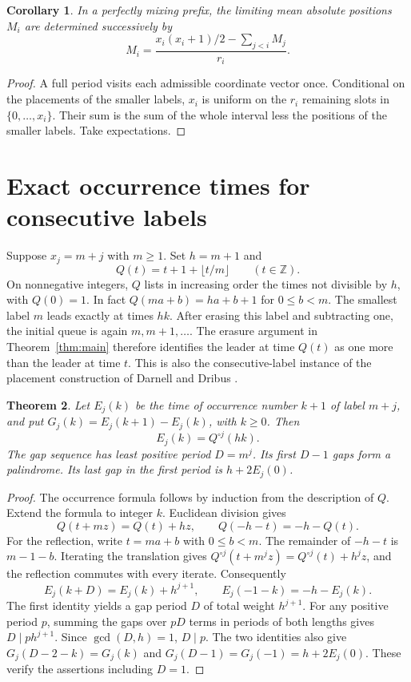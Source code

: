 \documentclass[11pt]{article}
\newtheorem{theorem}{Theorem}
\newtheorem{corollary}[theorem]{Corollary}
\begin{document}
\begin{corollary}\label{cor:mean}
In a perfectly mixing prefix, the limiting mean absolute positions $M_i$
are determined successively by
\[
  M_i=\frac{x_i(x_i+1)/2-\sum_{j<i}M_j}{r_i}.
\]
\end{corollary}
\begin{proof}
A full period visits each admissible coordinate vector once. Conditional on
the placements of the smaller labels, $x_i$ is uniform on the $r_i$ remaining
slots in $\{0,\ldots,x_i\}$. Their sum is the sum of the whole interval
less the positions of the smaller labels. Take expectations.
\end{proof}

\section{Exact occurrence times for consecutive labels}
Suppose $x_j=m+j$ with $m\ge1$. Set $h=m+1$ and
\[
 Q(t)=t+1+\lfloor t/m\rfloor\qquad(t\in\mathbb Z).
\]
On nonnegative integers, $Q$ lists in increasing order the times not
divisible by $h$, with $Q(0)=1$. In fact $Q(ma+b)=ha+b+1$ for
$0\le b<m$. The smallest label $m$ leads exactly at times $hk$.
After erasing this label and subtracting one, the initial queue is again
$m,m+1,\ldots$. The erasure argument in Theorem~\ref{thm:main}
therefore identifies the leader at time $Q(t)$ as one more than the leader
at time $t$. This is also the consecutive-label instance of the placement
construction of Darnell and Dribus \cite[Sec.\ 4]{dd}.

\begin{theorem}\label{thm:gaps}
Let $E_j(k)$ be the time of occurrence number $k+1$ of label $m+j$, and put
$G_j(k)=E_j(k+1)-E_j(k)$, with $k\ge0$. Then
\[
 E_j(k)=Q^{\circ j}(hk).
\]
The gap sequence has least positive period $D=m^j$. Its first $D-1$ gaps
form a palindrome. Its last gap in the first period is $h+2E_j(0)$.
\end{theorem}
\begin{proof}
The occurrence formula follows by induction from the description of $Q$.
Extend the formula to integer $k$. Euclidean division gives
\[
 Q(t+mz)=Q(t)+hz,\qquad Q(-h-t)=-h-Q(t).
\]
For the reflection, write $t=ma+b$ with $0\le b<m$. The remainder of
$-h-t$ is $m-1-b$. Iterating the translation gives
$Q^{\circ j}(t+m^jz)=Q^{\circ j}(t)+h^jz$, and the reflection commutes
with every iterate. Consequently
\[
 E_j(k+D)=E_j(k)+h^{j+1},\qquad E_j(-1-k)=-h-E_j(k).
\]
The first identity yields a gap period $D$ of total weight $h^{j+1}$.
For any positive period $p$, summing the gaps over $pD$ terms in periods
of both lengths gives $D\mid p h^{j+1}$. Since $\gcd(D,h)=1$, $D\mid p$.
The two identities also give $G_j(D-2-k)=G_j(k)$ and
$G_j(D-1)=G_j(-1)=h+2E_j(0)$. These verify the assertions including $D=1$.
\end{proof}
\end{document}
